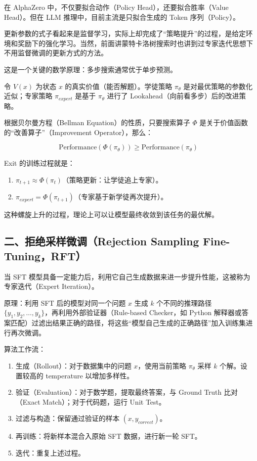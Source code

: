 在 AlphaZero 中，不仅要拟合动作（Policy Head），还要拟合胜率（Value Head）。但在 LLM 推理中，目前主流是只拟合生成的 Token 序列（Policy）。

更新参数的式子看起来是监督学习，实际上却完成了``策略提升''的过程，是给定环境和奖励下的强化学习。当然，前面讲蒙特卡洛树搜索时也讲到过专家迭代思想下不用监督微调的更新方式的方法。

这是一个关键的数学原理：多步搜索通常优于单步预测。

令 \(V(x)\) 为状态 \(x\) 的真实价值（能否解题）。学徒策略 \(\pi_\theta\) 是对最优策略的参数化近似；专家策略 \(\pi_{expert}\) 是基于 \(\pi_\theta\) 进行了 Lookahead（向前看多步）后的改进策略。

根据贝尔曼方程（Bellman Equation）的性质，只要搜索算子 \(\Phi\) 是关于价值函数的``改善算子''（Improvement Operator），那么：

\[
\mathrm{Performance}(\Phi(\pi_\theta))\ge \mathrm{Performance}(\pi_\theta)
\]

Exit 的训练过程就是：

\begin{enumerate}
\def\labelenumi{\arabic{enumi}.}
\tightlist
\item
  \(\pi_{t+1}\approx\Phi(\pi_t)\)（策略更新：让学徒追上专家）。
\item
  \(\pi_{expert}=\Phi(\pi_{t+1})\)（专家基于新学徒再次提升）。
\end{enumerate}

这种螺旋上升的过程，理论上可以让模型最终收敛到该任务的最优解。

\hypertarget{ux4e8cux62d2ux7eddux91c7ux6837ux5faeux8c03rejection-sampling-fine-tuningrft}{%
\subsection{二、拒绝采样微调（Rejection Sampling Fine-Tuning，RFT）}\label{ux4e8cux62d2ux7eddux91c7ux6837ux5faeux8c03rejection-sampling-fine-tuningrft}}

当 SFT 模型具备一定能力后，利用它自己生成数据来进一步提升性能，这被称为专家迭代（Expert Iteration）。

原理：利用 SFT 后的模型对同一个问题 \(x\) 生成 \(k\) 个不同的推理路径 \(\{y_1,y_2,\ldots,y_k\}\)，再利用外部验证器（Rule-based Checker，如 Python 解释器或答案匹配）过滤出结果正确的路径，将这些``模型自己生成的正确路径''加入训练集进行再次微调。

算法工作流：

\begin{enumerate}
\def\labelenumi{\arabic{enumi}.}
\tightlist
\item
  生成（Rollout）：对于数据集中的问题 \(x\)，使用当前策略 \(\pi_\theta\) 采样 \(k\) 个解。设置较高的 temperature 以增加多样性。
\item
  验证（Evaluation）：对于数学题，提取最终答案，与 Ground Truth 比对（Exact Match）；对于代码题，运行 Unit Test。
\item
  过滤与构造：保留通过验证的样本 \((x,y_{correct})\)。
\item
  再训练：将新样本混合入原始 SFT 数据，进行新一轮 SFT。
\item
  迭代：重复上述过程。
\end{enumerate}

